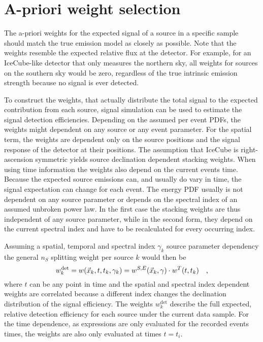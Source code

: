 \section{A-priori weight selection}
The a-priori weights for the expected signal of a source in a specific sample should match the true emission model as closely as possible.
Note that the weights resemble the expected relative flux at the detector.
For example, for an IceCube-like detector that only measures the northern sky, all weights for sources on the southern sky would be zero, regardless of the true intrinsic emission strength because no signal is ever detected.

To construct the weights, that actually distribute the total signal to the expected contribution from each source, signal simulation can be used to estimate the signal detection efficiencies.
Depending on the assumed per event PDFs, the weights might dependent on any source or any event parameter.
For the spatial term, the weights are dependent only on the source positions and the signal response of the detector at their positions.
The assumption that IceCube is right-ascension symmetric yields source declination dependent stacking weights.
When using time information the weights also depend on the current events time.
Because the expected source emissions can, and usually do vary in time, the signal expectation can change for each event.
The energy PDF usually is not dependent on any source parameter or depends on the spectral index of an assumed unbroken power law.
In the first case the stacking weights are thus independent of any source parameter, while in the second form, they depend on the current spectral index and have to be recalculated for every occurring index.

Assuming a spatial, temporal and spectral index $\gamma_k$ source parameter dependency the general $n_S$ splitting weight per source $k$ would then be
\begin{equation}
  w_k^\text{det} = w(\vec{x}_k, t, t_k, \gamma_k)
  = w^{S,E}(\vec{x}_k, \gamma) \cdot w^T(t, t_k)
  \quad\text{,}
\end{equation}
where $t$ can be any point in time and the spatial and spectral index dependent weights are correlated because a different index changes the declination distribution of the signal efficiency.
The weights $w_k^\text{det}$ describe the full expected, relative detection efficiency for each source under the current data sample.
For the time dependence, as expressions are only evaluated for the recorded events times, the weights are also only evaluated at times $t=t_i$.

